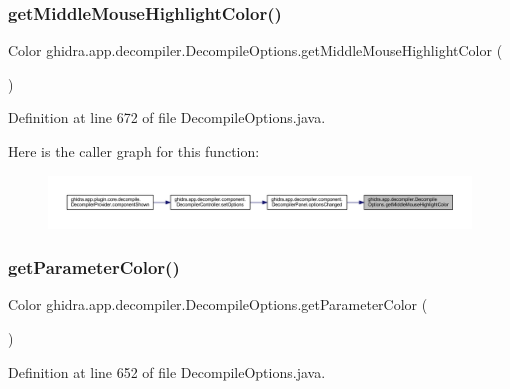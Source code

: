 \subsubsection{\texorpdfstring{getMiddleMouseHighlightColor()}{getMiddleMouseHighlightColor()}}
{\footnotesize\ttfamily Color ghidra.\+app.\+decompiler.\+Decompile\+Options.\+get\+Middle\+Mouse\+Highlight\+Color (\begin{DoxyParamCaption}{ }\end{DoxyParamCaption})\hspace{0.3cm}{\ttfamily [inline]}}



Definition at line 672 of file Decompile\+Options.\+java.

Here is the caller graph for this function\+:
\nopagebreak
\begin{figure}[H]
\begin{center}
\leavevmode
\includegraphics[width=350pt]{classghidra_1_1app_1_1decompiler_1_1_decompile_options_aadf412f9419edb4b46b21a0c41b4ff25_icgraph}
\end{center}
\end{figure}
\mbox{\label{classghidra_1_1app_1_1decompiler_1_1_decompile_options_a202289ca4c4bdbec5ac9f2a19c42657a}} 
\subsubsection{\texorpdfstring{getParameterColor()}{getParameterColor()}}
{\footnotesize\ttfamily Color ghidra.\+app.\+decompiler.\+Decompile\+Options.\+get\+Parameter\+Color (\begin{DoxyParamCaption}{ }\end{DoxyParamCaption})\hspace{0.3cm}{\ttfamily [inline]}}



Definition at line 652 of file Decompile\+Options.\+java.

\mbox{\label{classghidra_1_1app_1_1decompiler_1_1_decompile_options_a5ee64ec215290bbe05f5a342c1bbbe14}} 

